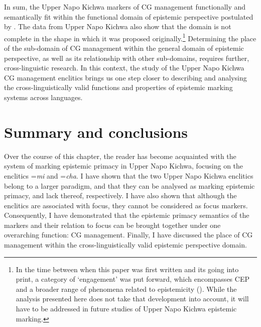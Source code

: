 \documentclass[output=paper]{langscibook}
\begin{document}
In sum, the Upper Napo Kichwa markers of CG management functionally and semantically fit within the functional domain of epistemic perspective postulated by \cite{Bergqvist2017}. The data from Upper Napo Kichwa also show that the domain is not complete in the shape in which it was proposed originally.\footnote{In the time between when this paper was first written and its going into print, a category of ‘engagement’ was put forward, which encompasses CEP and a broader range of phenomena related to epistemicity (\citealt{Evans2018}). While the analysis presented here does not take that development into account, it will have to be addressed in future studies of Upper Napo Kichwa epistemic marking.} 
Determining the place of the sub-domain of CG management within the general domain of epistemic perspective, as well as its relationship with other sub-domains, requires further, cross-linguistic research. In this context, the study of the Upper Napo Kichwa CG management enclitics brings us one step closer to describing and analysing the cross-linguistically valid functions and properties of epistemic marking systems across languages. 


\section{Summary and conclusions}\label{s:kg7}

Over the course of this chapter, the reader has become acquainted with the system of marking epistemic primacy in Upper Napo Kichwa, focusing on the enclitics =\textit{mi} and =\textit{cha}. I have shown that the two Upper Napo Kichwa enclitics belong to a larger paradigm, and that they can be analysed as marking epistemic primacy, and lack thereof, respectively. I have also shown that although the enclitics are associated with focus, they cannot be considered as focus markers. Consequently, I have demonstrated that the epistemic primacy semantics of the markers and their relation to focus can be brought together under one overarching function: CG management. Finally, I have discussed the place of CG management within the cross-linguistically valid epistemic perspective domain.
\end{document}
